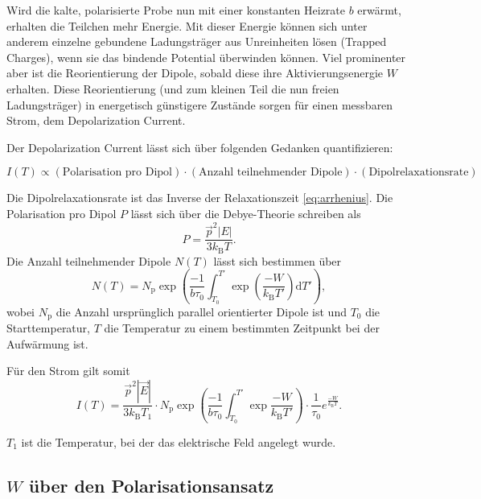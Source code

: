 Wird die kalte, polarisierte Probe nun mit einer konstanten Heizrate $b$ erwärmt, erhalten die Teilchen mehr Energie. Mit dieser Energie können sich unter anderem einzelne gebundene Ladungsträger aus Unreinheiten lösen (Trapped Charges), wenn sie
das bindende Potential überwinden können. Viel prominenter aber ist die Reorientierung der Dipole, sobald diese ihre Aktivierungsenergie $W$ erhalten. Diese Reorientierung (und zum kleinen Teil die nun freien Ladungsträger) in energetisch günstigere Zustände
sorgen für einen messbaren Strom, dem Depolarization Current.

Der Depolarization Current lässt sich über folgenden Gedanken quantifizieren:

\begin{equation*}
    I\left(T\right) \propto \left(\text{Polarisation pro Dipol}\right) \cdot \left(\text{Anzahl teilnehmender Dipole}\right) \cdot \left(\text{Dipolrelaxationsrate}\right)
\end{equation*}

Die Dipolrelaxationsrate ist das Inverse der Relaxationszeit \ref{eq:arrhenius}. Die Polarisation pro Dipol $P$ lässt sich über die Debye-Theorie schreiben als
\begin{equation}
    P = \frac{\vec{p}^2 \left\lvert E \right\rvert}{3 k_\text{B} T}.
    \label{eq:polarisation}
\end{equation}
Die Anzahl teilnehmender Dipole $N\left(T\right)$ lässt sich bestimmen über
\begin{equation}
    N\left(T\right) = N_\text{p} \exp\left(\frac{-1}{b\tau_0} \int_{T_0}^{T'} \exp\left(\frac{-W}{k_\text{B}T'}\right)\mathrm{d}T'\right),
    \label{eq:dipolanzahl}
\end{equation}
wobei $N_\text{p}$ die Anzahl ursprünglich parallel orientierter Dipole ist und $T_0$ die Starttemperatur, $T$ die Temperatur zu einem bestimmten Zeitpunkt bei der Aufwärmung ist.

Für den Strom gilt somit
\begin{equation}
    I\left(T\right) = \frac{\vec{p}^2 \left\lvert \vec{E} \right\rvert}{3 k_\text{B} T_1} \cdot N_\text{p} \exp\left(\frac{-1}{b\tau_0} \int_{T_0}^{T'} \exp{\frac{-W}{k_\text{B}T'}}\right) \cdot \frac{1}{\tau_0} e^{\frac{-W}{k_\text{B}T}}.
    \label{eq:strom_master}
\end{equation}

$T_1$ ist die Temperatur, bei der das elektrische Feld angelegt wurde.

\subsection{\(W\) über den Polarisationsansatz}

